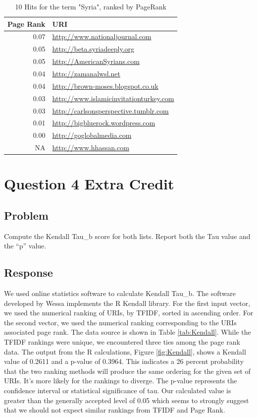 \documentclass[letterpaper,11pt]{report}
\begin{document}
\begin{savenotes}
\begin{table}
	\centering
    \begin{tabular}{|r|l|}
    \hline
    Page Rank & URI                                   \\ \hline
    0.07& \url{http://www.nationaljournal.com}        \\ \hline		
		0.05& \url{http://beta.syriadeeply.org}           \\ \hline
		0.05& \url{http://AmericanSyrians.com}            \\ \hline
    0.04& \url{http://zamanalwsl.net}                 \\ \hline
		0.04& \url{http://brown-moses.blogspot.co.uk}     \\ \hline		
    0.03& \url{http://www.islamicinvitationturkey.com}\\ \hline				
    0.03& \url{http://carlsonsperspective.tumblr.com} \\ \hline
    0.01& \url{http://bigbluerock.wordpress.com}      \\ \hline						
    0.00& \url{http://goglobalmedia.com}              \\ \hline
    NA & \url{http://www.hhassan.com}                 \\ \hline		
    \end{tabular}
    \caption {10 Hits for the term "Syria", ranked by PageRank}
			\label{tab:PageRank}
\end{table}

\section{Question 4 Extra Credit}
\subsection{Problem}Compute the Kendall Tau\_b score for both lists. Report both the Tau value and the ``p'' value.
\subsection{Response}We used online statistics software to calculate Kendall Tau\_b. The software developed by Wessa\cite{Wessa2012} implements the R Kendall library. For the first input vector, we used the numerical ranking of URIs, by TFIDF, sorted in ascending order. For the second vector, we used the numerical ranking corresponding to the URIs associated page rank. The data source is shown in Table \ref{tab:Kendall}. While the TFIDF rankings were unique, we encountered three ties among the page rank data. The output from the R calculations, Figure \ref{fig:Kendall}, shows a Kendall value of 0.2611 and a p-value of 0.3964. This indicates a 26 percent probability that the two ranking methods will produce the same ordering for the given set of URIs. It's more likely for the rankings to diverge. The p-value represents the confidence interval or statistical significance of tau. Our calculated value is greater than the generally accepted level of 0.05 which seems to strongly suggest that we should not expect similar rankings from TFIDF and Page Rank.


\end{savenotes}
\end{document}
